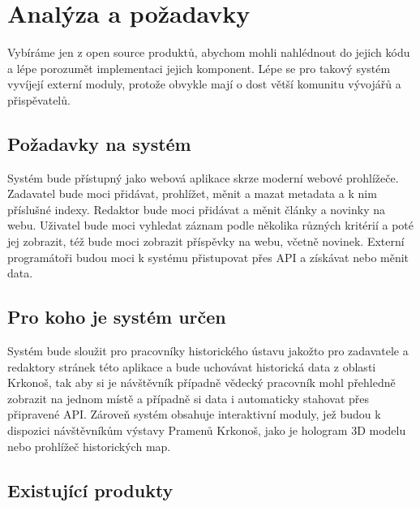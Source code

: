\chapter{Analýza a požadavky}
Vybíráme jen z open source produktů, abychom mohli nahlédnout
do jejich kódu a lépe porozumět implementaci jejich komponent.
Lépe se pro takový systém vyvíjejí externí moduly, protože
obvykle mají o dost větší komunitu vývojářů a přispěvatelů.


\section{Požadavky na systém}
Systém bude přístupný jako webová aplikace skrze moderní webové prohlížeče.
Zadavatel bude moci přidávat, prohlížet, měnit a mazat metadata a k nim příslušné indexy.
Redaktor bude moci přidávat a měnit články a novinky na webu.
Uživatel bude moci vyhledat záznam podle několika různých kritérií a poté jej zobrazit,
též bude moci zobrazit příspěvky na webu, včetně novinek.
Externí programátoři budou moci k systému přistupovat přes API a získávat nebo měnit data. 


\section{Pro koho je systém určen}
Systém bude sloužit pro pracovníky historického ústavu jakožto pro zadavatele
a redaktory stránek této aplikace a bude uchovávat historická data z oblasti Krkonoš,
tak aby si je návštěvník případně vědecký pracovník mohl přehledně
zobrazit na jednom místě a případně si data i automaticky stahovat přes připravené API.
Zároveň systém obsahuje interaktivní moduly, jež budou k dispozici
návštěvníkům výstavy Pramenů Krkonoš, jako je hologram 3D modelu nebo
prohlížeč historických map.

\clearpage
\section{Existující produkty}
